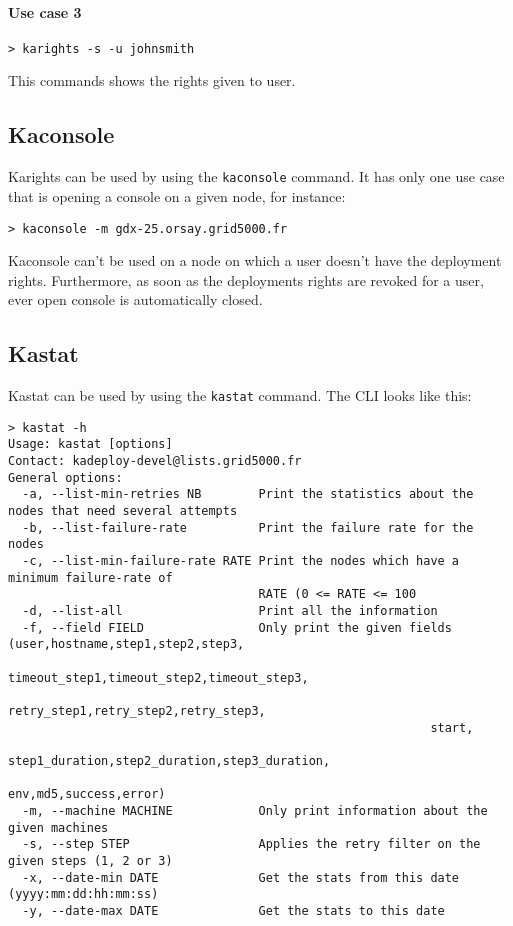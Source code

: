 \documentclass[a4wide,10pt,oneside]{book}
\begin{document}
\paragraph{Use case 3}
\begin{verbatim}
> karights -s -u johnsmith
\end{verbatim}
This commands shows the rights given to user.

\subsection{Kaconsole}\label{sec:kaconsole}
Karights can be used by using the \texttt{kaconsole} command. It has only one use case that is opening a console on a given node, for instance:
\begin{verbatim}
> kaconsole -m gdx-25.orsay.grid5000.fr
\end{verbatim}

Kaconsole can't be used on a node on which a user doesn't have the deployment rights. Furthermore, as soon as the deployments rights are revoked for a user, ever open console is automatically closed.

\subsection{Kastat}\label{sec:kastat}
Kastat can be used by using the \texttt{kastat} command. The CLI looks like this:
\begin{small}
\begin{verbatim}
> kastat -h
Usage: kastat [options]
Contact: kadeploy-devel@lists.grid5000.fr
General options:
  -a, --list-min-retries NB        Print the statistics about the nodes that need several attempts
  -b, --list-failure-rate          Print the failure rate for the nodes
  -c, --list-min-failure-rate RATE Print the nodes which have a minimum failure-rate of 
                                   RATE (0 <= RATE <= 100
  -d, --list-all                   Print all the information
  -f, --field FIELD                Only print the given fields (user,hostname,step1,step2,step3,
                                                           timeout_step1,timeout_step2,timeout_step3,
                                                           retry_step1,retry_step2,retry_step3,
                                                           start,
                                                           step1_duration,step2_duration,step3_duration,
                                                           env,md5,success,error)
  -m, --machine MACHINE            Only print information about the given machines
  -s, --step STEP                  Applies the retry filter on the given steps (1, 2 or 3)
  -x, --date-min DATE              Get the stats from this date (yyyy:mm:dd:hh:mm:ss)
  -y, --date-max DATE              Get the stats to this date
\end{verbatim}
\end{small}
\end{document}
